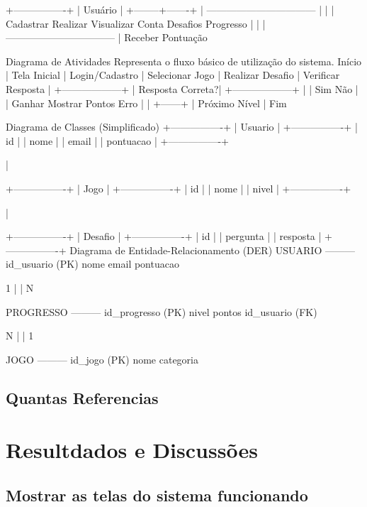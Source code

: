 \documentclass{article}
\begin{document}
+----------------+
            |    Usuário     |
            +--------+-------+
                     |
     ---------------------------------
     |              |               |
Cadastrar      Realizar       Visualizar
Conta          Desafios       Progresso
     |              |               |
     ---------------------------------
                     |
             Receber Pontuação

             Diagrama de Atividades
Representa o fluxo básico de utilização do sistema.
Início
   |
Tela Inicial
   |
Login/Cadastro
   |
Selecionar Jogo
   |
Realizar Desafio
   |
Verificar Resposta
   |
+------------------+
| Resposta Correta?|
+------------------+
      |      |
     Sim    Não
      |      |
Ganhar    Mostrar
Pontos    Erro
      |      |
      +------+
          |
Próximo Nível
          |
         Fim

         Diagrama de Classes (Simplificado)
         +----------------+
|   Usuario      |
+----------------+
| id             |
| nome           |
| email          |
| pontuacao      |
+----------------+

         |

+----------------+
|     Jogo       |
+----------------+
| id             |
| nome           |
| nivel          |
+----------------+

         |

+----------------+
|   Desafio      |
+----------------+
| id             |
| pergunta       |
| resposta       |
+----------------+
Diagrama de Entidade-Relacionamento (DER)
USUARIO
---------
id_usuario (PK)
nome
email
pontuacao

      1
      |
      |
      N

PROGRESSO
---------
id_progresso (PK)
nivel
pontos
id_usuario (FK)

      N
      |
      |
      1

JOGO
---------
id_jogo (PK)
nome
categoria
\subsection{Quantas Referencias}





\section{Resultdados e Discussões}

\subsection{Mostrar as telas do sistema funcionando}
\end{document}
